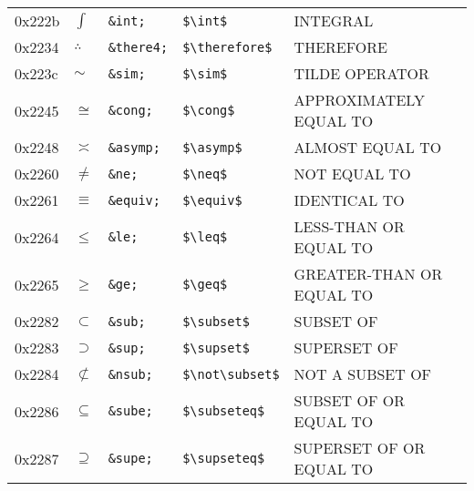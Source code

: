 \documentclass[a4paper,10pt]{article}
\begin{document}
{\begin{center}
\begin{xtabular}{llllp{10cm}}
0x222b & $\int$                 & \texttt{\&int;}     & \texttt{\${\textbackslash}int\$}                       & INTEGRAL                                   \\
0x2234 & $\therefore$           & \texttt{\&there4;}  & \texttt{\${\textbackslash}therefore\$}                 & THEREFORE                                  \\
0x223c & $\sim$                 & \texttt{\&sim;}     & \texttt{\${\textbackslash}sim\$}                       & TILDE OPERATOR                             \\
0x2245 & $\cong$                & \texttt{\&cong;}    & \texttt{\${\textbackslash}cong\$}                      & APPROXIMATELY EQUAL TO                     \\
0x2248 & $\asymp$               & \texttt{\&asymp;}   & \texttt{\${\textbackslash}asymp\$}                     & ALMOST EQUAL TO                            \\
0x2260 & $\neq$                 & \texttt{\&ne;}      & \texttt{\${\textbackslash}neq\$}                       & NOT EQUAL TO                               \\
0x2261 & $\equiv$               & \texttt{\&equiv;}   & \texttt{\${\textbackslash}equiv\$}                     & IDENTICAL TO                               \\
0x2264 & $\leq$                 & \texttt{\&le;}      & \texttt{\${\textbackslash}leq\$}                       & LESS-THAN OR EQUAL TO                      \\
0x2265 & $\geq$                 & \texttt{\&ge;}      & \texttt{\${\textbackslash}geq\$}                       & GREATER-THAN OR EQUAL TO                   \\
0x2282 & $\subset$              & \texttt{\&sub;}     & \texttt{\${\textbackslash}subset\$}                    & SUBSET OF                                  \\
0x2283 & $\supset$              & \texttt{\&sup;}     & \texttt{\${\textbackslash}supset\$}                    & SUPERSET OF                                \\
0x2284 & $\not\subset$          & \texttt{\&nsub;}    & \texttt{\${\textbackslash}not{\textbackslash}subset\$} & NOT A SUBSET OF                            \\
0x2286 & $\subseteq$            & \texttt{\&sube;}    & \texttt{\${\textbackslash}subseteq\$}                  & SUBSET OF OR EQUAL TO                      \\
0x2287 & $\supseteq$            & \texttt{\&supe;}    & \texttt{\${\textbackslash}supseteq\$}                  & SUPERSET OF OR EQUAL TO                    \\

\end{xtabular}
\end{center}}
\end{document}
